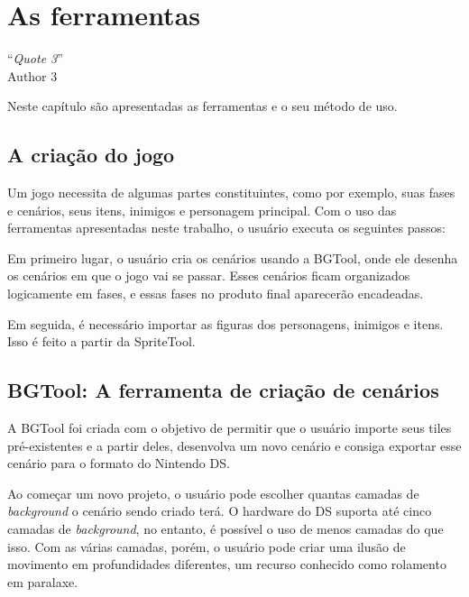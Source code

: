 \documentclass[brazil]{abnt}
\begin{document}
\chapter{As ferramentas\label{cap:ferramentas}}

\vfill{}
\begin{flushright}{}``\emph{Quote 3}''\\
{\small Author 3}\end{flushright}{\small \par}
\vfill{}

Neste capítulo são apresentadas as ferramentas e o seu método de uso.
\newpage

\section{A criação do jogo\label{sec:workflow}}

Um jogo necessita de algumas partes constituintes, como por exemplo, suas fases e cenários, seus itens, inimigos e personagem principal. Com o uso das ferramentas apresentadas neste trabalho, o usuário executa os seguintes passos:

Em primeiro lugar, o usuário cria os cenários usando a BGTool, onde ele desenha os cenários em que o jogo vai se passar. Esses cenários ficam organizados logicamente em fases, e essas fases no produto final aparecerão encadeadas.

Em seguida, é necessário importar as figuras dos personagens, inimigos e itens. Isso é feito a partir da SpriteTool. 

\section{BGTool: A ferramenta de criação de cenários}

A BGTool foi criada com o objetivo de permitir que o usuário importe seus tiles pré-existentes e a partir deles, desenvolva um novo cenário e consiga exportar esse cenário para o formato do Nintendo DS. 

Ao começar um novo projeto, o usuário pode escolher quantas camadas de \textit{background} o cenário sendo criado terá. O hardware do DS suporta até cinco camadas de \textit{background}, no entanto, é possível o uso de menos camadas do que isso. Com as várias camadas, porém, o usuário pode criar uma ilusão de movimento em profundidades diferentes, um recurso conhecido como rolamento em paralaxe.\footnotemark
\end{document}
